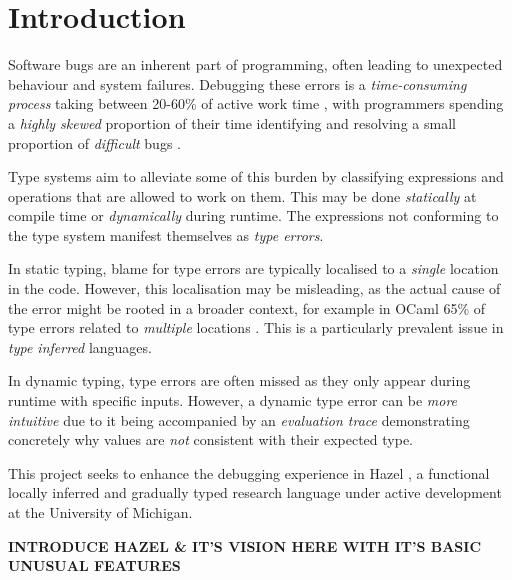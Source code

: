 \chapter{Introduction}
\label{chap:Introduction}
Software bugs are an inherent part of programming, often leading to unexpected behaviour and system failures. Debugging these errors is a \textit{time-consuming process} taking between 20-60\% of active work time \cite{DebugTimeSelfReport}, with programmers spending a \textit{highly skewed} proportion of their time identifying and resolving a small proportion of \textit{difficult} bugs \cite{DebugSkew}.

Type systems aim to alleviate some of this burden by classifying expressions and operations that are allowed to work on them. This may be done \textit{statically} at compile time or \textit{dynamically} during runtime. The expressions not conforming to the type system manifest themselves as \textit{type errors}.

In static typing, blame for type errors are typically localised to a \textit{single} location in the code. However, this localisation may be misleading, as the actual cause of the error might be rooted in a broader context, for example in OCaml 65\% of type errors related to \textit{multiple} locations \cite{StudentTypeErrorFixes}. This is a particularly prevalent issue in \textit{type inferred} languages.

In dynamic typing, type errors are often missed as they only appear during runtime with specific inputs. However, a dynamic type error can be \textit{more intuitive} \cite{TraceVisualisation} due to it being accompanied by an \textit{evaluation trace} demonstrating concretely why values are \textit{not} consistent with their expected type.

This project seeks to enhance the debugging experience in Hazel \cite{Hazel}, a functional locally inferred and gradually typed research language under active development at the University of Michigan. 

\textbf{INTRODUCE HAZEL \& IT'S VISION HERE WITH IT'S BASIC UNUSUAL FEATURES}

